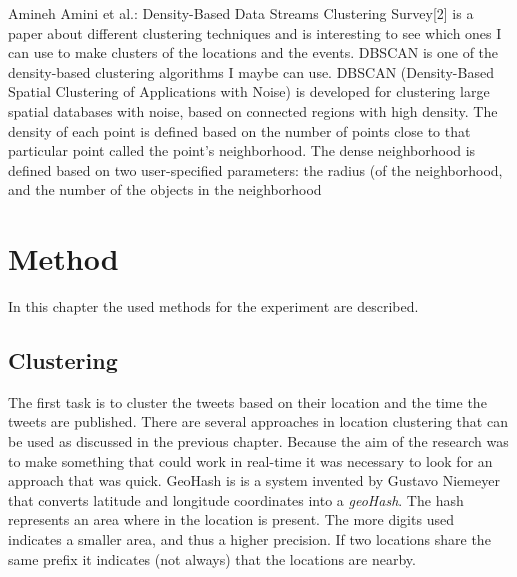 \documentclass[
10pt, %
a4paper, %
oneside, %
headinclude,footinclude, %
BCOR5mm, %
]{scrartcl}
\begin{document}
Amineh Amini et al.: Density-Based Data Streams Clustering Survey[2] is a paper about different clustering techniques and is interesting to see which ones I can use to make clusters of the locations and the events. DBSCAN is one of the density-based clustering algorithms I maybe can use.  DBSCAN (Density-Based Spatial Clustering of Applications with Noise) is developed for clustering large spatial databases with noise, based on connected regions with high density. The density of each point is defined based on the number of points close to that particular point called the point's neighborhood.
The dense neighborhood is defined based on two user-specified parameters: the radius (of the neighborhood, and the number of the objects in the neighborhood 




\newpage
\section{Method}
In this chapter the used methods for the experiment are described. 

\subsection{Clustering}
The first task is to cluster the tweets based on their location and the time the tweets are published. There are several approaches in location clustering that can be used as discussed in the previous chapter. Because the aim of the research was to make something that could work in real-time it was necessary to look for an approach that was quick. GeoHash is is a system invented by Gustavo Niemeyer \cite{geohash} that converts latitude and longitude coordinates into a \textit{geoHash}. The hash represents an area where in the location is present. The more digits used indicates a smaller area, and thus a higher precision. If two locations share the same prefix it indicates (not always) that the locations are nearby. 
\end{document}
